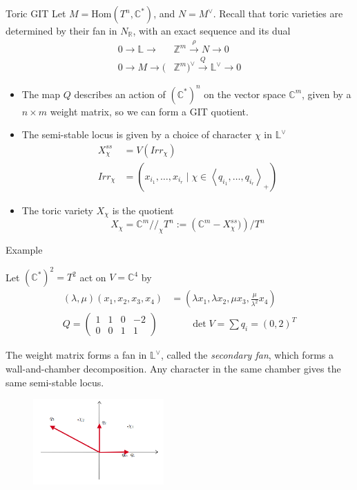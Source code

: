 \documentclass{beamer}
\begin{document}
\begin{frame}{Toric GIT}
Let $M = \mathrm{Hom}(T^{n}, \mathbb{C}^*)$, and $N = M^{\vee}$. Recall that toric varieties are determined by their fan in $N_\mathbb{R}$, with an exact sequence and its dual
\begin{align}
0 \to \mathbb{L}\to &\mathbb{Z}^{m}\xrightarrow{\rho}N \to 0 \\
0 \to M \to (&\mathbb{Z}^{m})^{\vee} \xrightarrow{Q} \mathbb{L}^{\vee}\to {0}
\end{align}

\begin{itemize}
    \item The map $Q$ describes an action of $(\mathbb{C}^{*})^n$ on the vector space $\mathbb{C}^m$, given by a $n\times m$ weight matrix, so we can form a GIT quotient.
    \item The semi-stable locus is given by a choice of character $\chi$ in $\mathbb{L}^\vee$ 
    \begin{align*}
        X^{ss}_\chi &= V(Irr_\chi )\\
        Irr_{\chi}&= (x_{i_{1}},\dots,x_{i_{r}} \mid \chi \in \left< q_{i_{1}},\dots,q_{i_{r}}\right>_{+} )
    \end{align*}
    \item The toric variety $X_\chi$ is the quotient $$X_\chi = \mathbb{C}^{m}//_{\chi}T^{n}:= \left(\mathbb{C}^{m}-X^{ss}_\chi)\right)  /T^n$$
        
\end{itemize}
\end{frame}

\begin{frame}{Example}



Let $(\mathbb{C}^{*})^{2}= T^2$ act on $V = \mathbb{C}^4$ by 
\begin{align*}
(\lambda,\mu)(x_1,x_2,x_3,x_{4}) &= \left( \lambda x_{1}, \lambda x_{2},\mu x_{3}, \frac{\mu}{\lambda^{2}}x_4 \right)\\
Q = \begin{pmatrix}1&1&0&-2 \\ 0&0&1&1\end{pmatrix} & \qquad \det V = \sum q_i = (0,2)^T
\end{align*}

The weight matrix forms a fan in $\mathbb{L}^\vee$, called the \emph{secondary fan}, which forms a wall-and-chamber decomposition.  Any character in the same chamber gives the same semi-stable locus. 

\begin{figure}[!h]
    \centering
    \includegraphics[width = 5cm]{secondary fan.png}
\end{figure}
\end{frame}
\end{document}
